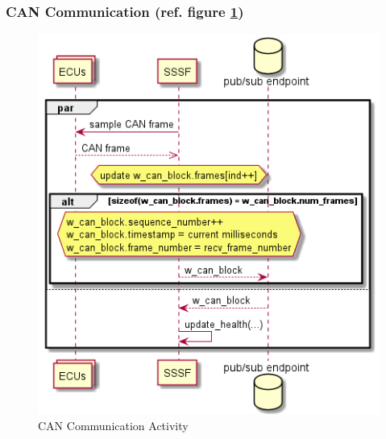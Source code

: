 \documentclass[letterpaper,twocolumn,12pt]{article}
\begin{document}

\subsubsection{CAN Communication (ref. figure \ref{fig:can_x})}
\begin{figure}[]
    \centering
    \includegraphics[scale=0.9]{out/images/can_exchange/can_exchange.png}
    \caption{CAN Communication Activity}
    \label{fig:can_x}
\end{figure}
\end{document}
